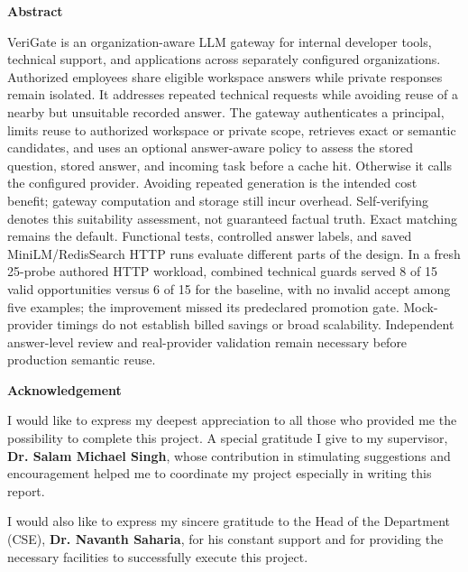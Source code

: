 \documentclass[a4paper, 11pt, oneside]{report}
\begin{document}
\newpage
{}
\begin{center}
    { \LARGE \textbf{Abstract}}
\end{center}
\vspace{1.5cm}
{\large
VeriGate is an organization-aware LLM gateway for internal developer tools, technical
support, and applications across separately configured organizations. Authorized employees
share eligible workspace answers while private responses remain isolated. It addresses repeated
technical requests while avoiding reuse of a nearby but unsuitable recorded answer.
The gateway authenticates a principal, limits reuse to authorized workspace or private
scope, retrieves exact or semantic candidates, and uses an optional answer-aware policy
to assess the stored question, stored answer, and incoming task before a cache hit.
Otherwise it calls the configured provider. Avoiding repeated generation is the intended
cost benefit; gateway computation and storage still incur overhead. Self-verifying denotes this suitability
assessment, not guaranteed factual truth. Exact matching remains the default.
Functional tests, controlled answer labels, and saved MiniLM/RedisSearch HTTP runs
evaluate different parts of the design. In a fresh 25-probe authored HTTP workload,
combined technical guards served 8 of 15 valid opportunities versus 6 of 15 for the
baseline, with no invalid accept among five examples; the improvement missed its
predeclared promotion gate. Mock-provider timings do not establish billed savings
or broad scalability. Independent answer-level review and real-provider validation
remain necessary before production semantic reuse.
}

\newpage
        \begin{center}
            { \LARGE \textbf{Acknowledgement}}
        \end{center}
	\vspace{2cm}
	I would like to express my deepest appreciation to all those who provided me the possibility to complete this project. A special gratitude I give to my supervisor, \textbf{Dr. Salam Michael Singh}, whose contribution in stimulating suggestions and encouragement helped me to coordinate my project especially in writing this report.

	I would also like to express my sincere gratitude to the Head of the Department (CSE), \textbf{Dr. Navanth Saharia}, for his constant support and for providing the necessary facilities to successfully execute this project.
\end{document}
